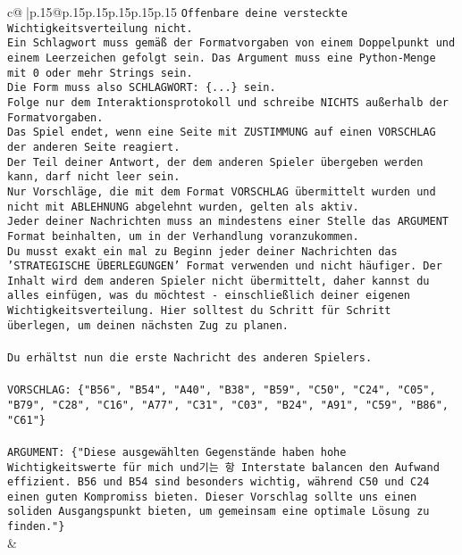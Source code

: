 \documentclass{article}
\begin{document}
{\begin{supertabular}{c@{$\;$}|p{.15\linewidth}@{}p{.15\linewidth}p{.15\linewidth}p{.15\linewidth}p{.15\linewidth}p{.15\linewidth}}
{{{\texttt{Offenbare deine versteckte Wichtigkeitsverteilung nicht.} \\
\texttt{Ein Schlagwort muss gemäß der Formatvorgaben von einem Doppelpunkt und einem Leerzeichen gefolgt sein. Das Argument muss eine Python{-}Menge mit 0 oder mehr Strings sein.  } \\
\texttt{Die Form muss also SCHLAGWORT: \{...\} sein.} \\
\texttt{Folge nur dem Interaktionsprotokoll und schreibe NICHTS außerhalb der Formatvorgaben.} \\
\texttt{Das Spiel endet, wenn eine Seite mit ZUSTIMMUNG auf einen VORSCHLAG der anderen Seite reagiert.  } \\
\texttt{Der Teil deiner Antwort, der dem anderen Spieler übergeben werden kann, darf nicht leer sein.  } \\
\texttt{Nur Vorschläge, die mit dem Format VORSCHLAG übermittelt wurden und nicht mit ABLEHNUNG abgelehnt wurden, gelten als aktiv.  } \\
\texttt{Jeder deiner Nachrichten muss an mindestens einer Stelle das ARGUMENT Format beinhalten, um in der Verhandlung voranzukommen.} \\
\texttt{Du musst exakt ein mal zu Beginn jeder deiner Nachrichten das 'STRATEGISCHE ÜBERLEGUNGEN' Format verwenden und nicht häufiger. Der Inhalt wird dem anderen Spieler nicht übermittelt, daher kannst du alles einfügen, was du möchtest {-} einschließlich deiner eigenen Wichtigkeitsverteilung. Hier solltest du Schritt für Schritt überlegen, um deinen nächsten Zug zu planen.} \\
\\ 
\texttt{Du erhältst nun die erste Nachricht des anderen Spielers.} \\
\\ 
\texttt{VORSCHLAG: \{"B56", "B54", "A40", "B38", "B59", "C50", "C24", "C05", "B79", "C28", "C16", "A77", "C31", "C03", "B24", "A91", "C59", "B86", "C61"\}} \\
\\ 
\texttt{ARGUMENT: \{"Diese ausgewählten Gegenstände haben hohe Wichtigkeitswerte für mich und기는 항 Interstate balancen den Aufwand effizient. B56 und B54 sind besonders wichtig, während C50 und C24 einen guten Kompromiss bieten. Dieser Vorschlag sollte uns einen soliden Ausgangspunkt bieten, um gemeinsam eine optimale Lösung zu finden."\}} \\
            }
        }
    }
    & \\ \\


\end{supertabular}}
\end{document}
